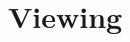 \documentclass[../COS3712_Notes.tex]{subfiles}
\begin{document}
  \setcounter{chapter}{4}
  \chapter{Viewing}
\end{document}
